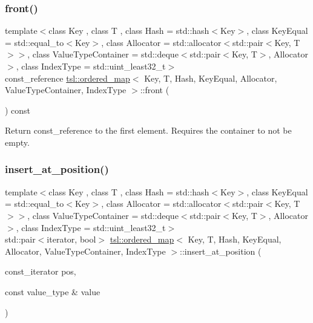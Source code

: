\subsubsection{\texorpdfstring{front()}{front()}}
{\footnotesize\ttfamily template$<$class Key , class T , class Hash  = std\+::hash$<$\+Key$>$, class Key\+Equal  = std\+::equal\+\_\+to$<$\+Key$>$, class Allocator  = std\+::allocator$<$std\+::pair$<$\+Key, T$>$$>$, class Value\+Type\+Container  = std\+::deque$<$std\+::pair$<$\+Key, T$>$, Allocator$>$, class Index\+Type  = std\+::uint\+\_\+least32\+\_\+t$>$ \\
const\+\_\+reference \mbox{\hyperlink{classtsl_1_1ordered__map}{tsl\+::ordered\+\_\+map}}$<$ Key, T, Hash, Key\+Equal, Allocator, Value\+Type\+Container, Index\+Type $>$\+::front (\begin{DoxyParamCaption}{ }\end{DoxyParamCaption}) const\hspace{0.3cm}{\ttfamily [inline]}}

Return const\+\_\+reference to the first element. Requires the container to not be empty. \mbox{\label{classtsl_1_1ordered__map_a1d8e2e86cb1443f623f8476eb2300129}} 
\subsubsection{\texorpdfstring{insert\_at\_position()}{insert\_at\_position()}\hspace{0.1cm}{\footnotesize\ttfamily [1/2]}}
{\footnotesize\ttfamily template$<$class Key , class T , class Hash  = std\+::hash$<$\+Key$>$, class Key\+Equal  = std\+::equal\+\_\+to$<$\+Key$>$, class Allocator  = std\+::allocator$<$std\+::pair$<$\+Key, T$>$$>$, class Value\+Type\+Container  = std\+::deque$<$std\+::pair$<$\+Key, T$>$, Allocator$>$, class Index\+Type  = std\+::uint\+\_\+least32\+\_\+t$>$ \\
std\+::pair$<$iterator, bool$>$ \mbox{\hyperlink{classtsl_1_1ordered__map}{tsl\+::ordered\+\_\+map}}$<$ Key, T, Hash, Key\+Equal, Allocator, Value\+Type\+Container, Index\+Type $>$\+::insert\+\_\+at\+\_\+position (\begin{DoxyParamCaption}\item[{const\+\_\+iterator}]{pos,  }\item[{const value\+\_\+type \&}]{value }\end{DoxyParamCaption})\hspace{0.3cm}{\ttfamily [inline]}}

